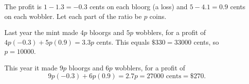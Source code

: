 The profit is $1-1.3=-0.3$ cents on each bloorg (a loss) and $5-4.1=0.9$ cents on each wobbler. Let each part of the ratio be $p$ coins.

Last year the mint made $4p$ bloorgs and $5p$ wobblers, for a profit of $4p(-0.3)+5p(0.9)=3.3p$ cents. This equals $\$330=33000$ cents, so $p=10000$.

This year it made $9p$ bloorgs and $6p$ wobblers, for a profit of
\[9p(-0.3)+6p(0.9)=2.7p=27000\text{ cents}=\boxed{\$270}.\]
